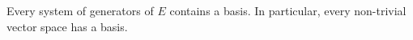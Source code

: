 Every system of generators of $E$ contains a basis. In particular, every non-trivial vector space has a basis.
